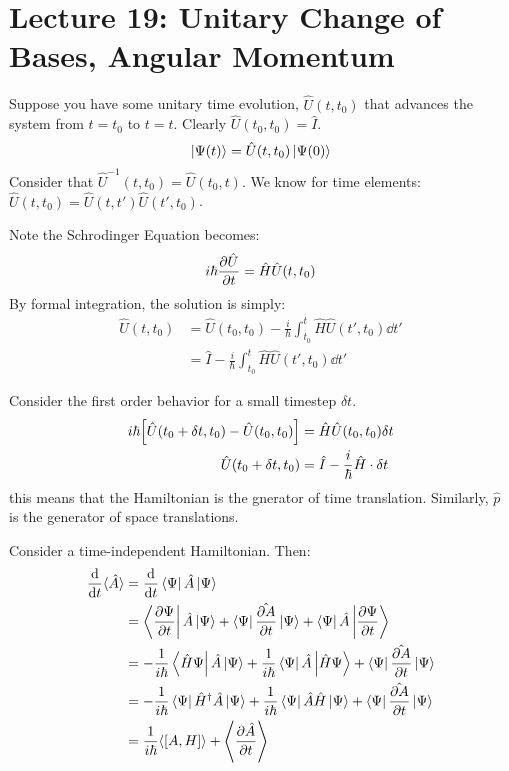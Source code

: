 \section{Lecture 19: Unitary Change of Bases, Angular Momentum}

Suppose you have some unitary time evolution, $\hat{U}(t, t_0)$ that advances the system from $t = t_0$ to $t = t$. Clearly $\hat{U}(t_0, t_0) = \hat{I}$.
\[ \ket{\Psi(t)} = \hat{U}(t, t_0) \ket{\Psi(0)} \]
Consider that $\hat{U}^{-1}(t, t_0) = \hat{U}(t_0, t)$. We know for time elements:
$\hat{U}(t, t_0) = \hat{U}(t, t') \hat{U}(t', t_0)$.

Note the Schrodinger Equation becomes:
\[ i\hbar \partialderivative{\hat{U}}{t}(t, t_0) = \hat{H}\hat{U}(t, t_0) \]
By formal integration, the solution is simply:
\begin{align*}
    \hat{U}(t, t_0) &= \hat{U}(t_0, t_0) - \frac{i}{\hbar} \int_{t_0}^t \hat{H}\hat{U}(t', t_0) \dd{t'} \\
    &= \hat{I} - \frac{i}{\hbar} \int_{t_0}^t \hat{H}\hat{U}(t', t_0) \dd{t'}
\end{align*}

Consider the first order behavior for a small timestep $\delta t$.
\begin{align*}
    i\hbar\qty[\hat{U}(t_0 + \delta t, t_0) - \hat{U}(t_0, t_0)] &= \hat{H} \hat{U}(t_0, t_0) \delta t \\
    \hat{U}(t_0 + \delta t, t_0) &= \hat{I} - \frac{i}{\hbar} \hat{H} \cdot \delta t
\end{align*}
this means that the Hamiltonian is the gnerator of time translation. Similarly, $\hat{p}$ is the generator of space translations.

Consider a time-independent Hamiltonian. Then:
\begin{align*}
    \dv{}{t} \langle \hat{A} \rangle &= \dv{}{t} \bra{\Psi} \hat{A} \ket{\Psi} \\
    &= \bra{\pdv{\Psi}{t}} \hat{A} \ket{\Psi} + \bra{\Psi} \hat{\partialderivative{A}{t}} \ket{\Psi} + \bra{\Psi} \hat{A} \ket{\pdv{\Psi}{t}} \\
    &= -\frac{1}{i\hbar} \bra{\hat{H}\Psi} \hat{A} \ket{\Psi} + \frac{1}{i\hbar} \bra{\Psi} \hat{A} \ket{\hat{H}\Psi} + \bra{\Psi}  \hat{\partialderivative{A}{t}} \ket{\Psi} \\
    &= -\frac{1}{i\hbar} \bra{\Psi} \hat{H}^{\dagger} \hat{A} \ket{\Psi} + \frac{1}{i\hbar} \bra{\Psi} \hat{A}\hat{H} \ket{\Psi} + \bra{\Psi}  \hat{\partialderivative{A}{t}} \ket{\Psi} \\
    &= \frac{1}{i\hbar} \langle [A, H] \rangle + \left\langle \pdv{\hat{A}}{t} \right\rangle
\end{align*}

